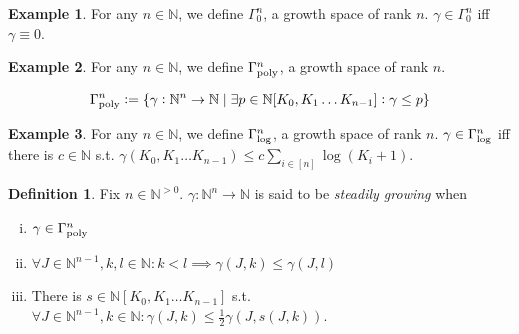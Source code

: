 \documentclass{article}
\numberwithin{equation}{section}
\theoremstyle{definition}
\newtheorem{definition}{Definition}[section]
\newtheorem{example}{Example}[section]
\theoremstyle{plain}
\newcommand{\Nats}{\mathbb{N}}
\newcommand{\NatPoly}{\Nats[K_0, K_1 \ldots K_{n-1}]}
\newcommand{\NatFun}{\Nats^n \rightarrow}
\newcommand{\GammaPoly}{\Gamma_{\textnormal{poly}}}
\newcommand{\GammaLog}{\Gamma_{\textnormal{log}}}
\begin{document}
\begin{example}

For any $n \in \Nats$, we define $\Gamma_0^n$, a growth space of rank $n$. $\gamma \in \Gamma_0^n$ iff $\gamma \equiv 0$.

\end{example}

\begin{example}

For any $n \in \Nats$, we define $\GammaPoly^n$, a growth space of rank $n$. 

\[\GammaPoly^n := \{\gamma: \NatFun \Nats \mid \exists p \in \NatPoly: \gamma \leq p\}\]

\end{example}

\begin{example}

For any $n \in \Nats$, we define $\GammaLog^n$, a growth space of rank $n$. $\gamma \in \GammaLog^n$ iff there is $c \in \Nats$ s.t. $\gamma(K_0, K_1 \ldots K_{n-1}) \leq c \sum_{i \in [n]} \log(K_i+1)$.

\end{example}

\begin{samepage}
\begin{definition}
\label{def:sgrow}
Fix ${n \in \Nats^{>0}}$. ${\gamma: \NatFun \Nats}$ is said to be \emph{steadily growing} when
\begin{enumerate}[(i)]
\item ${\gamma \in \GammaPoly^n}$
\item ${\forall J \in \Nats^{n-1}, k,l \in \Nats: k < l \implies \gamma(J,k) \leq \gamma(J,l)}$
\item\label{con:def__sgrow__poly} There is ${s \in \NatPoly}$ s.t. ${\forall J \in \Nats^{n-1}, k \in \Nats: \gamma(J,k) \leq \frac{1}{2}\gamma(J,s(J,k))}$.
\end{enumerate}
\end{definition}
\end{samepage}
\end{document}
